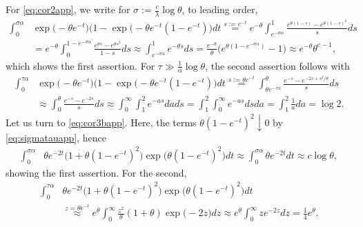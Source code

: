 \documentclass{imsart}
\theoremstyle{plain}
\theoremstyle{definition}
\begin{document}
For \eqref{eq:cor2app}, we write for  $\sigma := \tfrac c\lambda \log\theta$, to leading order,
\begin{align*}
    \int_0^{\sigma \alpha} &  \exp\Big(-\theta e^{-t}\Big)\Big(1 - \exp\Big(-\theta e^{-t}(1 - e^{-t})\Big) dt \stackrel{s:=e^{-t}} =
    e^{-\theta} \int_{e^{-\sigma \alpha}}^1 \frac{e^{\theta(1 - s)} - e^{\theta(1 - s)^2}}{s}ds \\ & 
    = e^{-\theta} \int_0^{1 - e^{-\sigma\alpha}} \frac{e^{\theta s} - e^{\theta s^2}}{1 - s} ds
    \approx \int_{e^{-\sigma\alpha}}^1 e^{-\theta s} ds = \frac{e^{-\theta}}{\theta} \Big(e^{\theta (1 - e^{-\sigma \alpha})} - 1\Big) 
    \approx e^{-\theta} \theta^{c-1},
\end{align*}
which shows the first assertion. For $\tau \gg \tfrac 1 \alpha \log\theta$, the second assertion follows with
\begin{align*}
    \int_0^{\tau \alpha} &  \exp\Big(-\theta e^{-t}\Big)\Big(1 - \exp\Big(-\theta e^{-t}(1 - e^{-t})\Big) dt \stackrel{s:=\theta e^{-t}} =
    \int_{\theta e^{-\tau\alpha}}^\theta \frac{e^{-s} - e^{-2s + s^2/\theta}}{s} ds  \\ & \approx \int_0^\theta \frac{e^{-s} - e^{-2s}}{s} ds \approx \int_0^\infty \int_1^2 e^{-as} da ds = \int_1^2 \int_0^\infty  e^{-as} ds da = \int_1^2 \frac 1a da = \log 2.
\end{align*}
Let us turn to \eqref{eq:cor3bapp}. Here, the terms $\theta(1 - e^{-t})^2 \downarrow 0$ by \eqref{eq:sigmatauapp}, hence
\begin{align*}
    \int_0^{\sigma \alpha} & \theta e^{-2t}\big(1 + \theta(1 - e^{-t})^2 \big) \exp\Big(\theta(1 - e^{- t})^2 \Big) dt \approx \int_0^{\sigma\alpha} \theta e^{-2t} dt \approx c \log\theta,
\end{align*}
showing the first assertion. For the second, 
\begin{align*}
    \int_0^{\tau \alpha} & \theta e^{-2t}\big(1 + \theta(1 - e^{-t})^2 \big) \exp\Big(\theta(1 - e^{- t})^2 \Big) dt \\ & \stackrel{z = \theta e^{-t}} \approx e^\theta \int_0^\infty \tfrac{z^2}{\theta} (1 + \theta) \exp\big(-2 z  \big) dz \approx e^\theta \int_0^\infty z e^{-2z} dz = \tfrac 14 e^\theta. 
\end{align*}
\end{document}
